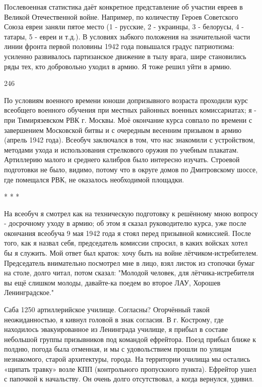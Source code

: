Послевоенная статистика даёт конкретное представление об участии евреев в Великой Отечественной войне. Например, по количеству Героев Советского Союза евреи заняли пятое место (1 - русские, 2 - украинцы, 3 - белорусы, 4 - татары, 5 - евреи и т.д.). В условиях зыбкого положения на значительной части линии фронта первой половины 1942 года повышался градус патриотизма: усиленно развивалось партизанское движение в тылу врага, шире становились ряды тех, кто добровольно уходил в армию. Я тоже решил уйти в армию.

246

По условиям военного времени юноши допризывного возраста проходили курс всеобщего военного обучения при местных районных военных комиссариатах; я - при Тимирязевском РВК г. Москвы. Моё окончание курса совпало по времени с завершением Московской битвы и с очередным весенним призывом в армию (апрель 1942 года). Всеобуч заключался в том, что нас знакомили с устройством, методами ухода и использования стрелкового оружия по учебным плакатам. Артиллерию малого и среднего калибров было интересно изучать. Строевой подготовки не было, видимо, потому что в округе домов по Дмитровскому шоссе, где помещался РВК, не оказалось необходимой площадки.

* * *

На всеобуч я смотрел как на техническую подготовку к решённому мною вопросу - досрочному уходу в армию; об этом я сказал руководителю курса, уже после окончания всеобуча 9 мая 1942 года я стоял перед призывной комиссией. После того, как я назвал себя, председатель комиссии спросил, в каких войсках хотел бы я служить. Мой ответ был краток: хочу быть на войне лётчиком-истребителем. Председатель внимательно посмотрел мне в лицо, взял листок из стопочки бумаг на столе, долго читал, потом сказал: "Молодой человек, для лётчика-истребителя вы ещё слишком молоды, давайте-ка поедем во второе ЛАУ, Хорошев Ленинградское."

Саба 1250 артиллерийское училище. Согласны? Огорчённый такой неожиданностью, я кивнул головой в знак согласия. В г. Кострому, где находилось эвакуированное из Ленинграда училище, я прибыл в составе небольшой группы призывников под командой ефрейтора. Поезд прибыл ближе к полдню, погода была отменная, и мы с удовольствием прошли по улицам незнакомого, старой архитектуры, города. На территории училища мы остались «щипать травку» возле КПП (контрольного пропускного пункта). Ефрейтор ушел с папочкой к начальству. Он очень долго отсутствовал, а когда вернулся, удивил.

